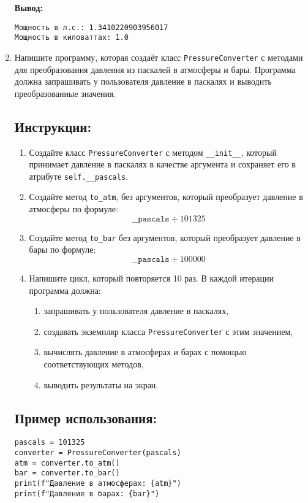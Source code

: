 \begin{enumerate}
\textbf{Вывод:}
\begin{verbatim}
Мощность в л.с.: 1.3410220903956017
Мощность в киловаттах: 1.0
\end{verbatim}


\item

Напишите программу, которая создаёт класс \texttt{PressureConverter} с методами для преобразования давления
из паскалей в атмосферы и бары. Программа должна запрашивать у пользователя давление в паскалях
и выводить преобразованные значения.

\subsection*{Инструкции:}
\begin{enumerate}
\item Создайте класс \texttt{PressureConverter} с методом
\texttt{\_\_init\_\_}, который принимает давление в паскалях в
качестве аргумента и сохраняет его в атрибуте \texttt{self.\_\_pascals}.

\item Создайте метод \texttt{to\_atm},
без аргументов, который преобразует давление в атмосферы по формуле:
\[
\texttt{\_\_pascals} \div 101325
\]

\item Создайте метод \texttt{to\_bar} без аргументов,
который преобразует давление в бары по формуле:
\[
\texttt{\_\_pascals} \div 100000
\]

\item Напишите цикл, который повторяется 10 раз. В каждой итерации программа должна:
\begin{enumerate}
\item запрашивать у пользователя давление в паскалях,
\item создавать экземпляр класса \texttt{PressureConverter} с этим значением,
\item вычислять давление в атмосферах и барах с помощью соответствующих методов,
\item выводить результаты на экран.
\end{enumerate}
\end{enumerate}

\subsection*{Пример использования:}
\begin{verbatim}
pascals = 101325
converter = PressureConverter(pascals)
atm = converter.to_atm()
bar = converter.to_bar()
print(f"Давление в атмосферах: {atm}")
print(f"Давление в барах: {bar}")
\end{verbatim}


\end{enumerate}
